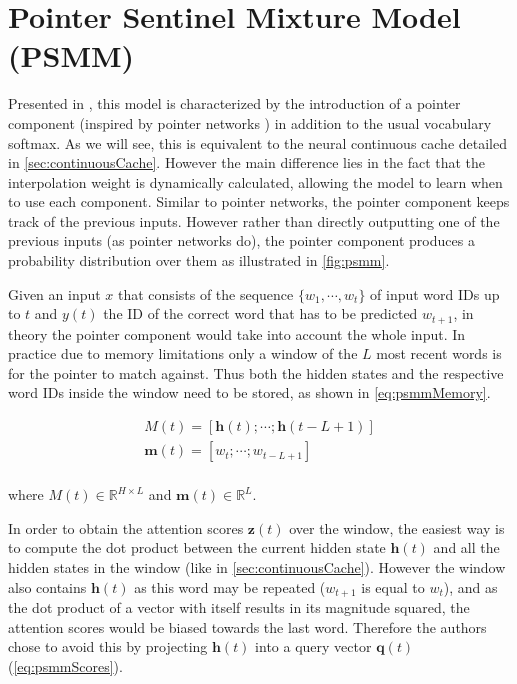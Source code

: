 \section{Pointer Sentinel Mixture Model (PSMM)}
\label{sec:pointerMixture}

Presented in \cite{merity2016pointer}, this model is characterized by the introduction of a pointer component (inspired by pointer networks \cite{vinyals2015pointer}) in addition to the usual vocabulary softmax. As we will see, this is equivalent to the neural continuous cache detailed in \autoref{sec:continuousCache}. However the main difference lies in the fact that the interpolation weight is dynamically calculated, allowing the model to learn when to use each component. Similar to pointer networks, the pointer component keeps track of the previous inputs. However rather than directly outputting one of the previous inputs (as pointer networks do), the pointer component produces a probability distribution over them as illustrated in \autoref{fig:psmm}.

\begin{figure}[H]
	\centering
	\label{fig:psmm}
\end{figure}

Given an input $x$ that consists of the sequence $\{w_1, \cdots , w_t\}$ of input word IDs up to $t$ and $y(t)$ the ID of the correct word that has to be predicted $w_{t+1}$, in theory the pointer component would take into account the whole input. In practice due to memory limitations only a window of the $L$ most recent words is  for the pointer to match against. Thus both the hidden states and the respective word IDs inside the window need to be stored, as shown in \autoref{eq:psmmMemory}.

\begin{equation} \label{eq:psmmMemory}
	\begin{gathered}
		M(t) = [\mathbf{h}(t); \cdots; \mathbf{h}(t-L+1) ] \\
		\mathbf{m}(t) = [w_t; \cdots; w_{t-L+1}] \\
	\end{gathered}
\end{equation}

where $M(t) \in \mathbb{R}^{H \times L}$ and $\mathbf{m}(t) \in \mathbb{R}^{L}$. 

In order to obtain the attention scores $\mathbf{z}(t)$ over the window, the easiest way is to compute the dot product between the current hidden state $\mathbf{h}(t)$ and all the hidden states in the window (like in \autoref{sec:continuousCache}). However the window also contains $\mathbf{h}(t)$ as this word may be repeated ($w_{t+1}$ is equal to $w_t$), and as the dot product of a vector with itself results in its magnitude squared, the attention scores would be biased towards the last word. Therefore the authors chose to avoid this by projecting $\mathbf{h}(t)$ into a query vector $\mathbf{q}(t)$ (\autoref{eq:psmmScores}).


